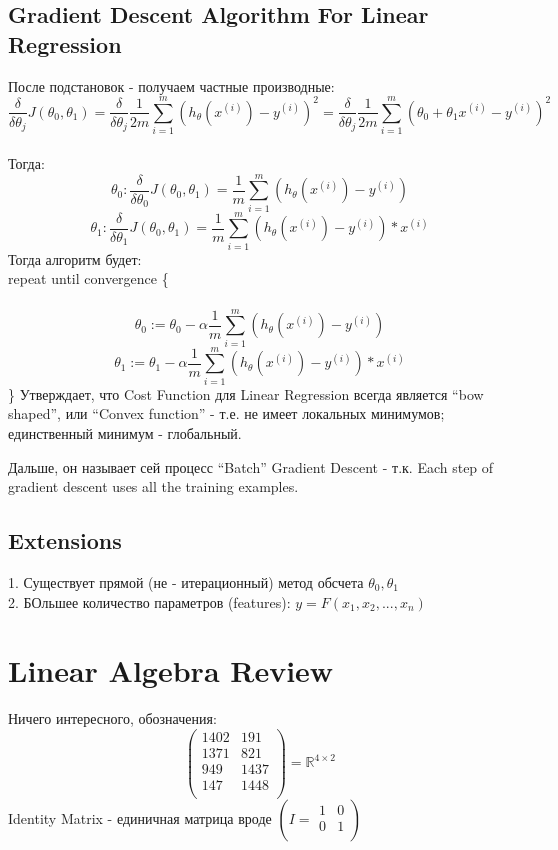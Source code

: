 \documentclass{scrartcl}
\begin{document}
\subsection {Gradient Descent Algorithm For Linear Regression }
\label {2-7}
После подстановок - получаем частные производные:
\[ \frac {\delta}{\delta \theta_j} J(\theta_0,
  \theta_1) =  \frac {\delta}{\delta \theta_j}  \frac{1}{2m}
  \sum\limits_{i=1}^m\left( h_\theta (x^{(i)}) - y^{(i)} \right)^2 = \frac
  {\delta}{\delta \theta_j}  \frac{1}{2m} \sum\limits_{i=1}^m\left(\theta_0 +
    \theta_1 x^{(i)} - y^{(i)} \right)^2
\] \\
Тогда:
\[
\theta_0 : \frac {\delta}{\delta \theta_0} J(\theta_0,
  \theta_1) =  \frac{1}{m} \sum\limits_{i=1}^m\left(h_\theta (x^{(i)})
    - y^{(i)} \right) \]
\[
\theta_1 : \frac {\delta}{\delta \theta_1} J(\theta_0,
  \theta_1) = \frac{1}{m} \sum\limits_{i=1}^m\left(h_\theta (x^{(i)})
    - y^{(i)} \right) * x^{(i)}
\]
Тогда алгоритм будет: \\
repeat until convergence \{ \\
\
\[\theta_0 := \theta_0 - {\alpha} \frac{1}{m} \sum\limits_{i=1}^m\left(h_\theta (x^{(i)})
    - y^{(i)} \right) \]
\[\theta_1 := \theta_1 - {\alpha} \frac{1}{m} \sum\limits_{i=1}^m\left(h_\theta (x^{(i)})
    - y^{(i)} \right) * x^{(i)} \]
\}
Утверждает, что Cost Function для Linear Regression всегда является
``bow shaped'', или ``Convex function'' - т.е. не имеет локальных
минимумов; единственный минимум - глобальный.

Дальше, он называет сей процесс ``Batch'' Gradient Descent - т.к. Each
step of gradient descent uses all the training examples.

\subsection {Extensions}
\label {2-8}
1. Существует прямой (не - итерационный) метод обсчета $\theta_0,
\theta_1$ \\
2. БОльшее количество параметров (features): $y = F(x_1, x_2, ..., x_n)$

\section {Linear Algebra Review}
Ничего интересного, обозначения:
\[
\left( \begin{array}{cc} 
1402 & 191 \\
1371 & 821 \\ 949 & 1437 \\ 147 & 1448 \\
\end{array} \right) = \mathbb{R}^{4\times2}
\]
Identity Matrix - единичная матрица вроде $\left( I = \begin{array}{cc}
1 & 0 \\ 0 & 1 \\
  \end{array}
\right)$
\end{document}
